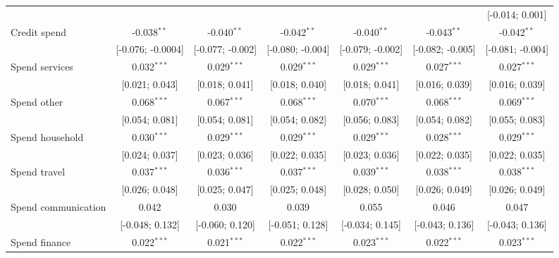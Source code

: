 \begin{table}[htbp]
\begin{threeparttable}[b]
\begin{tabular}{lcccccc}
                                   &                   &                  &                  &                  &                  & [-0.014; 0.001]\\   
         Credit spend              & -0.038$^{**}$     & -0.040$^{**}$    & -0.042$^{**}$    & -0.040$^{**}$    & -0.043$^{**}$    & -0.042$^{**}$\\   
                                   & [-0.076; -0.0004] & [-0.077; -0.002] & [-0.080; -0.004] & [-0.079; -0.002] & [-0.082; -0.005] & [-0.081; -0.004]\\   
         Spend services            & 0.032$^{***}$     & 0.029$^{***}$    & 0.029$^{***}$    & 0.029$^{***}$    & 0.027$^{***}$    & 0.027$^{***}$\\   
                                   & [0.021; 0.043]    & [0.018; 0.041]   & [0.018; 0.040]   & [0.018; 0.041]   & [0.016; 0.039]   & [0.016; 0.039]\\   
         Spend other               & 0.068$^{***}$     & 0.067$^{***}$    & 0.068$^{***}$    & 0.070$^{***}$    & 0.068$^{***}$    & 0.069$^{***}$\\   
                                   & [0.054; 0.081]    & [0.054; 0.081]   & [0.054; 0.082]   & [0.056; 0.083]   & [0.054; 0.082]   & [0.055; 0.083]\\   
         Spend household           & 0.030$^{***}$     & 0.029$^{***}$    & 0.029$^{***}$    & 0.029$^{***}$    & 0.028$^{***}$    & 0.029$^{***}$\\   
                                   & [0.024; 0.037]    & [0.023; 0.036]   & [0.022; 0.035]   & [0.023; 0.036]   & [0.022; 0.035]   & [0.022; 0.035]\\   
         Spend travel              & 0.037$^{***}$     & 0.036$^{***}$    & 0.037$^{***}$    & 0.039$^{***}$    & 0.038$^{***}$    & 0.038$^{***}$\\   
                                   & [0.026; 0.048]    & [0.025; 0.047]   & [0.025; 0.048]   & [0.028; 0.050]   & [0.026; 0.049]   & [0.026; 0.049]\\   
         Spend communication       & 0.042             & 0.030            & 0.039            & 0.055            & 0.046            & 0.047\\   
                                   & [-0.048; 0.132]   & [-0.060; 0.120]  & [-0.051; 0.128]  & [-0.034; 0.145]  & [-0.043; 0.136]  & [-0.043; 0.136]\\   
         Spend finance             & 0.022$^{***}$     & 0.021$^{***}$    & 0.022$^{***}$    & 0.023$^{***}$    & 0.022$^{***}$    & 0.023$^{***}$\\   

\end{tabular}
\end{threeparttable}
\end{table}
